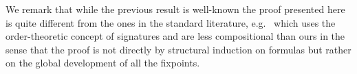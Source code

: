 We remark that while the previous result is well-known 
the proof presented here 
is quite different from the ones in the standard literature, e.g.\  \cite{Bradfield01modallogics} 
which uses the order-theoretic concept of 
signatures and are less compositional than ours in the sense that the proof is not directly by structural induction on formulas but rather on the global development of all the fixpoints. 